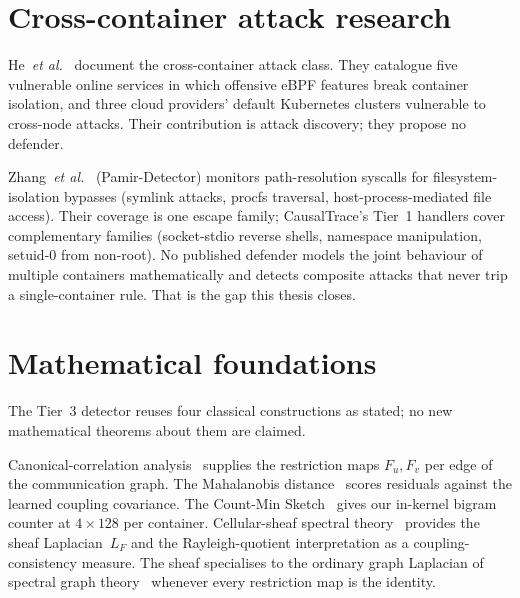 \section{Cross-container attack research}
\label{sec:lit-cross}

He~\emph{et al.}~\cite{he2023cross} document the cross-container attack
class. They catalogue five vulnerable online services in which offensive
eBPF features break container isolation, and three cloud providers' default
Kubernetes clusters vulnerable to cross-node attacks. Their contribution is
attack discovery; they propose no defender.

Zhang~\emph{et al.}~\cite{zhang2025path} (Pamir-Detector) monitors
path-resolution syscalls for filesystem-isolation bypasses (symlink attacks,
procfs traversal, host-process-mediated file access). Their coverage is
one escape family; CausalTrace's Tier~1 handlers cover complementary
families (socket-stdio reverse shells, namespace manipulation, setuid-0
from non-root). No published defender models the joint behaviour of
multiple containers mathematically and detects composite attacks that never
trip a single-container rule. That is the gap this thesis closes.

\section{Mathematical foundations}
\label{sec:lit-math}

The Tier~3 detector reuses four classical constructions as stated; no new
mathematical theorems about them are claimed.

Canonical-correlation analysis~\cite{hotelling1936} supplies the restriction
maps $F_u, F_v$ per edge of the communication graph. The Mahalanobis
distance~\cite{mahalanobis1936} scores residuals against the learned
coupling covariance. The Count-Min Sketch~\cite{cormode2005cms} gives our
in-kernel bigram counter at $4 \times 128$ per container. Cellular-sheaf
spectral theory~\cite{hansen2019spectral,curry2014sheaves,robinson2014topological}
provides the sheaf Laplacian~$L_F$ and the Rayleigh-quotient interpretation
as a coupling-consistency measure. The sheaf specialises to the ordinary
graph Laplacian of spectral graph theory~\cite{chung1997spectral} whenever
every restriction map is the identity.

